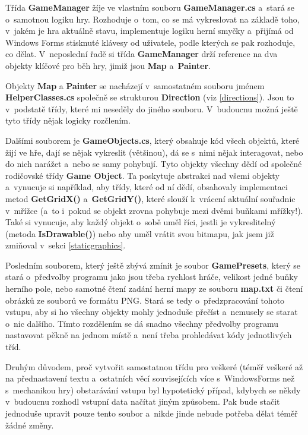 \documentclass[a4]{article}
\begin{document}
Třída \textbf{GameManager} žíje ve vlastním souboru \textbf{GameManager.cs} a~stará se o~samotnou logiku hry. Rozhoduje o~tom, co se má vykreslovat na základě toho, v~jakém je hra aktuálně stavu, implementuje logiku herní smyčky a~přijímá od Windows Forms stisknuté klávesy od uživatele, podle kterých se pak rozhoduje, co dělat. V~neposlední řadě si třída \textbf{GameManager} drží reference na dva objekty klíčové pro běh hry, jimiž jsou \textbf{Map} a~\textbf{Painter}.

Objekty \textbf{Map} a \textbf{Painter} se nacházejí v~samostatném souboru jménem \textbf{HelperClasses.cs} společně se strukturou \textbf{Direction} (viz \ref{directions}). Jsou to v~podstatě třídy, které mi neseděly do jiného souboru. V~budoucnu možná ještě tyto třídy nějak logicky rozčlením. 

Dalšími souborem je \textbf{GameObjects.cs}, který obsahuje kód všech objektů, které žijí ve hře, dají se nějak vykreslit (většinou), dá se s~nimi nějak interagovat, nebo do nich narážet a~nebo se samy pohybují. Tyto objekty všechny dědí od společné rodičovské třídy \textbf{Game Object}. Ta poskytuje abstrakci nad všemi objekty a~vynucuje si například, aby třídy, které od ní dědí, obsahovaly implementaci metod \textbf{GetGridX()} a~\textbf{GetGridY()}, které slouží k~vrácení aktuální souřadnic v~mřížce (a~to i~pokud se objekt zrovna pohybuje mezi dvěmi buňkami mřížky!). Také si vynucuje, aby každý objekt o~sobě uměl říci, jestli je vykreslitelný (metoda \textbf{IsDrawable()}) nebo aby uměl vrátit svou bitmapu, jak jsem již zmiňoval v~sekci \ref{staticgraphics}.

Posledním souborem, který ještě zbývá zmínit je soubor \textbf{GamePresets}, který se stará o~předvolby programu jako jsou třeba rychlost hráče, velikost jedné buňky herního pole, nebo samotné čtení zadání herní mapy ze souboru \textbf{map.txt} či čtení obrázků ze souborů ve formátu PNG. Stará se tedy o~předzpracování tohoto vstupu, aby si ho všechny objekty mohly jednoduše přečíst a~nemusely se starat o~nic dalšího. Tímto rozdělením se dá snadno všechny předvolby programu nastavovat pěkně na jednom místě a~není třeba prohledávat kódy jednotlivých tříd.

Druhým důvodem, proč vytvořit samostatnou třídu pro veškeré (téměř veškeré až na přednastavení textu a~ostatních věcí souvisejících více s~WindowsForms než s~mechanikou hry) obstarávání vstupu byl hypotetický případ, kdybych se někdy v~budoucnu rozhodl vstupní data načítat jiným způsobem. Pak bude stačit jednoduše upravit pouze tento soubor a~nikde jinde nebude potřeba dělat téměř žádné změny.
\end{document}
